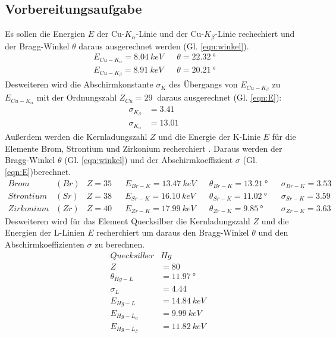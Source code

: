 \subsection{Vorbereitungsaufgabe}
Es sollen die Energien $E$ der Cu-$K_{\alpha}$-Linie und der Cu-$K_{\beta}$-Linie rechechiert \cite{3} und der Bragg-Winkel $\theta$ daraus ausgerechnet werden (Gl. \eqref{eqn:winkel}).
\begin{align*}
  E_{Cu-K_{\alpha}}=\SI{8.04}{keV} && \theta=\SI{22.32}{°}\\
  E_{Cu-K_{\beta}}=\SI{8.91}{keV}  && \theta=\SI{20.21}{°}
\end{align*}
Desweiteren wird die Abschirmkonstante $\sigma_{K}$ des Übergangs von $E_{Cu-K_{\beta}}$ zu $E_{Cu-K_{\alpha}}$ mit der Ordnungszahl $Z_{Cu}=\SI{29}{}$ \cite{3} daraus ausgerechnet (Gl. \eqref{eqn:E}):
\begin{align}
  \sigma_{K_{\beta}} &=\SI{3.41}{}\\
  \sigma_{K_{\alpha}} &=\SI{13.01}{}
\end{align}
Außerdem werden die Kernladungszahl $Z$ und die Energie der K-Linie $E$ für die Elemente Brom, Strontium und Zirkonium recherchiert \cite{2}.
Daraus werden der Bragg-Winkel $\theta$ (Gl. \eqref{eqn:winkel}) und der Abschirmkoeffizient $\sigma$ (Gl. \eqref{eqn:E})berechnet.
\begin{align*}
  Brom      &(Br)&  Z=35 & & E_{Br-K}=\SI{13.47}{keV} & & \theta_{Br-K}= \SI{13.21}{°} & & \sigma_{Br-K}=\SI{3.53}{}& \\
  Strontium &(Sr)&  Z=38 & & E_{Sr-K}=\SI{16.10}{keV} & & \theta_{Sr-K}= \SI{11.02}{°} & & \sigma_{Sr-K}=\SI{3.59}{}& \\
  Zirkonium &(Zr)&  Z=40 & & E_{Zr-K}=\SI{17.99}{keV} & & \theta_{Zr-K}= \SI{9.85}{°}  & & \sigma_{Zr-K}=\SI{3.63}{}&
\end{align*}
Desweiteren wird für das Element Quecksilber die Kernladungszahl $Z$ und die Energien der L-Linien $E$ recherchiert \cite{2} um daraus den Bragg-Winkel $\theta$ und den Abschirmkoeffizienten $\sigma$ zu berechnen.
\begin{align*}
  &Quecksilber        &    Hg \\
  &Z                  &=   80 \\
  &\theta_{Hg-L}      &=   \SI{11.97}{°} \\
  &\sigma_{L}         &=   \SI{4.44}{}\\
  &E_{Hg-L}           &=   \SI{14.84}{keV}\\
  &E_{Hg-L_{\alpha}}  &=   \SI{9.99}{keV}\\
  &E_{Hg-L_{\beta}}   &=   \SI{11.82}{keV}
\end{align*}
